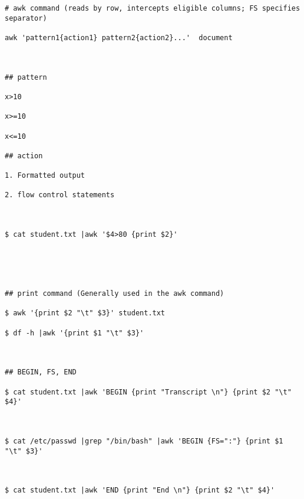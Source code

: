 \documentclass[
]{article}
\begin{document}
\begin{verbatim}
# awk command (reads by row, intercepts eligible columns; FS specifies separator)

awk 'pattern1{action1} pattern2{action2}...'  document



## pattern

x>10

x>=10

x<=10

## action

1. Formatted output 

2. flow control statements



$ cat student.txt |awk '$4>80 {print $2}'





## print command (Generally used in the awk command)

$ awk '{print $2 "\t" $3}' student.txt

$ df -h |awk '{print $1 "\t" $3}'



## BEGIN, FS, END 

$ cat student.txt |awk 'BEGIN {print "Transcript \n"} {print $2 "\t" $4}'



$ cat /etc/passwd |grep "/bin/bash" |awk 'BEGIN {FS=":"} {print $1 "\t" $3}'



$ cat student.txt |awk 'END {print "End \n"} {print $2 "\t" $4}'
\end{verbatim}
\end{document}
